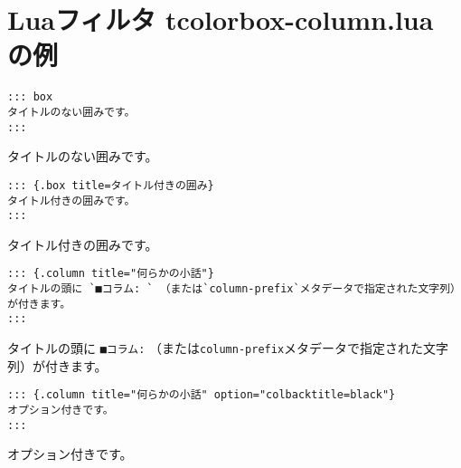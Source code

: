 \documentclass[
  a4paper,
  lualatex,
  ja=standard]{bxjsarticle}
\author{}
\date{}
\begin{document}

\hypertarget{luaux30d5ux30a3ux30ebux30bf-tcolorbox-column.lua-ux306eux4f8b}{%
\section{Luaフィルタ tcolorbox-column.lua
の例}\label{luaux30d5ux30a3ux30ebux30bf-tcolorbox-column.lua-ux306eux4f8b}}

\begin{verbatim}
::: box
タイトルのない囲みです。
:::
\end{verbatim}

\begin{tcolorbox}

タイトルのない囲みです。

\end{tcolorbox}

\begin{verbatim}
::: {.box title=タイトル付きの囲み}
タイトル付きの囲みです。
:::
\end{verbatim}

\begin{tcolorbox}[title=タイトル付きの囲み,]

タイトル付きの囲みです。

\end{tcolorbox}

\begin{verbatim}
::: {.column title="何らかの小話"}
タイトルの頭に `■コラム: ` （または`column-prefix`メタデータで指定された文字列）が付きます。
:::
\end{verbatim}

\begin{tcolorbox}[title=■コラム:~何らかの小話,]

タイトルの頭に \texttt{■コラム:}
（または\texttt{column-prefix}メタデータで指定された文字列）が付きます。

\end{tcolorbox}

\begin{verbatim}
::: {.column title="何らかの小話" option="colbacktitle=black"}
オプション付きです。
:::
\end{verbatim}

\begin{tcolorbox}[title=■コラム:~何らかの小話,colbacktitle=black]

オプション付きです。

\end{tcolorbox}
\end{document}
